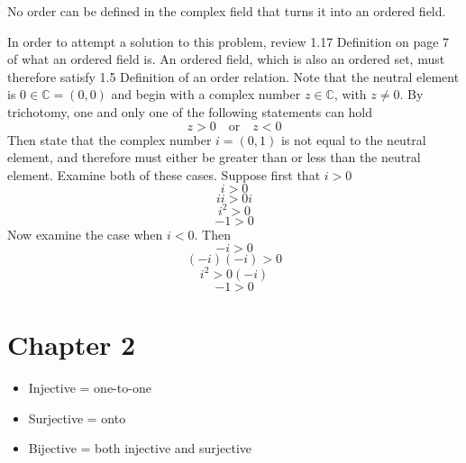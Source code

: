 \begin{example}
  No order can be defined in the complex field that turns it into an ordered field.

  \begin{proof-dan}
    In order to attempt a solution to this problem, review 1.17 Definition on page 7 of what an ordered field is.
    An ordered field, which is also an ordered set, must therefore satisfy 1.5 Definition of an order relation.
    Note that the neutral element is $0\in\mathbb{C}=(0,0)$ and begin with a complex number $z\in\mathbb{C}$, with $z\neq 0$.
    By trichotomy, one and only one of the following statements can hold
    \begin{equation*}
      z>0\quad\text{or}\quad z<0
    \end{equation*}
    Then state that the complex number $i=(0,1)$ is not equal to the neutral element, and therefore must either be greater than or less than the neutral element.
    Examine both of these cases.
    Suppose first that $i>0$
    \begin{equation*}
      i>0
    \end{equation*}
    \begin{equation*}
      ii>0i
    \end{equation*}
    \begin{equation*}
      i^{2}>0
    \end{equation*}
    \begin{equation*}
      -1>0
    \end{equation*}
    Now examine the case when $i<0$.
    Then
    \begin{equation*}
    -i>0
    \end{equation*}
    \begin{equation*}
    (-i)(-i)>0
    \end{equation*}
    \begin{equation*}
    i^{2}>0(-i)
    \end{equation*}
    \begin{equation*}
    -1>0
    \end{equation*}
  \end{proof-dan}
\end{example}

\section{Chapter 2}

\begin{itemize}
  \item{Injective = one-to-one}
  \item{Surjective = onto}
  \item{Bijective = both injective and surjective}
\end{itemize}

